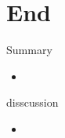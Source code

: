 \section{End}
\begin{frame}{Summary}
  \begin{itemize}
    \item
  \end{itemize}
\end{frame}
\begin{frame}{disscussion}
  \begin{itemize}
    \item
  \end{itemize}
\end{frame}